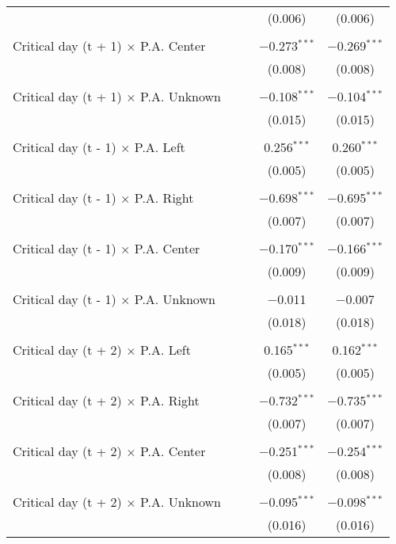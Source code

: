 \documentclass[
]{article}
\begin{document}
\begin{table}[!htbp]
{\begin{tabular}{@{\extracolsep{5pt}}lcccc}
  &  &  & (0.006) & (0.006) \\ 
  & & & & \\ 
 Critical day (t + 1) $\times$ P.A. Center &  &  & $-$0.273$^{***}$ & $-$0.269$^{***}$ \\ 
  &  &  & (0.008) & (0.008) \\ 
  & & & & \\ 
 Critical day (t + 1) $\times$ P.A. Unknown &  &  & $-$0.108$^{***}$ & $-$0.104$^{***}$ \\ 
  &  &  & (0.015) & (0.015) \\ 
  & & & & \\ 
 Critical day (t - 1) $\times$ P.A. Left &  &  & 0.256$^{***}$ & 0.260$^{***}$ \\ 
  &  &  & (0.005) & (0.005) \\ 
  & & & & \\ 
 Critical day (t - 1) $\times$ P.A. Right &  &  & $-$0.698$^{***}$ & $-$0.695$^{***}$ \\ 
  &  &  & (0.007) & (0.007) \\ 
  & & & & \\ 
 Critical day (t - 1) $\times$ P.A. Center &  &  & $-$0.170$^{***}$ & $-$0.166$^{***}$ \\ 
  &  &  & (0.009) & (0.009) \\ 
  & & & & \\ 
 Critical day (t - 1) $\times$ P.A. Unknown &  &  & $-$0.011 & $-$0.007 \\ 
  &  &  & (0.018) & (0.018) \\ 
  & & & & \\ 
 Critical day (t + 2) $\times$ P.A. Left &  &  & 0.165$^{***}$ & 0.162$^{***}$ \\ 
  &  &  & (0.005) & (0.005) \\ 
  & & & & \\ 
 Critical day (t + 2) $\times$ P.A. Right &  &  & $-$0.732$^{***}$ & $-$0.735$^{***}$ \\ 
  &  &  & (0.007) & (0.007) \\ 
  & & & & \\ 
 Critical day (t + 2) $\times$ P.A. Center &  &  & $-$0.251$^{***}$ & $-$0.254$^{***}$ \\ 
  &  &  & (0.008) & (0.008) \\ 
  & & & & \\ 
 Critical day (t + 2) $\times$ P.A. Unknown &  &  & $-$0.095$^{***}$ & $-$0.098$^{***}$ \\ 
  &  &  & (0.016) & (0.016) \\ 

\end{tabular}}
\end{table}
\end{document}
